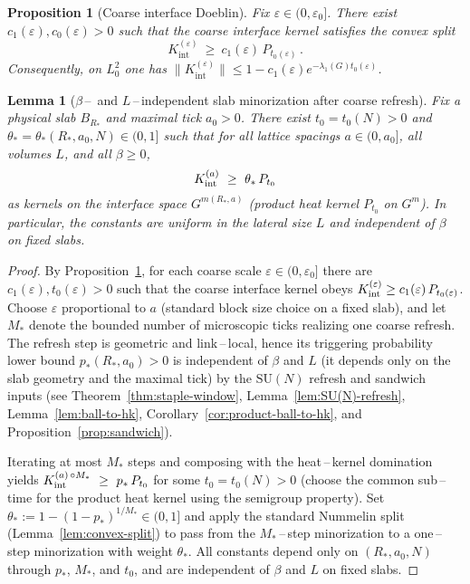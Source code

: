 \documentclass[11pt]{amsart}
\theoremstyle{plain}
\newtheorem{lemma}[theorem]{Lemma}
\newtheorem{proposition}[theorem]{Proposition}
\theoremstyle{definition}
\theoremstyle{remark}
\begin{document}
\begin{proposition}[Coarse interface Doeblin]\label{prop:coarse-doeblin}
Fix $\varepsilon\in(0,\varepsilon_0]$. There exist $c_1(\varepsilon),c_0(\varepsilon)>0$ such that the coarse interface kernel satisfies the convex split
\[
  K_{\mathrm{int}}^{(\varepsilon)}\ \ge\ c_1(\varepsilon)\, P_{t_0(\varepsilon)}\,.
\]
Consequently, on $L_0^2$ one has $\|K_{\mathrm{int}}^{(\varepsilon)}\|\le 1- c_1(\varepsilon) e^{-\lambda_1(G) t_0(\varepsilon)}$.
\end{proposition}

\begin{lemma}[\boldmath $\beta$\,–\, and $L$\,–\,independent slab minorization after coarse refresh]\label{lem:beta-L-independent-minorization}
Fix a physical slab $B_{R_*}$ and maximal tick $a_0>0$. There exist $t_0=t_0(N)>0$ and $\theta_*=\theta_*(R_*,a_0,N)\in(0,1]$ such that for all lattice spacings $a\in(0,a_0]$, all volumes $L$, and all $\beta\ge 0$,
\[
  K_{\rm int}^{(a)}\ \ge\ \theta_*\, P_{t_0}
\]
as kernels on the interface space $G^{m(R_*,a)}$ (product heat kernel $P_{t_0}$ on $G^m$). In particular, the constants are uniform in the lateral size $L$ and independent of $\beta$ on fixed slabs.
\end{lemma}
\begin{proof}
By Proposition~\ref{prop:coarse-doeblin}, for each coarse scale $\varepsilon\in(0,\varepsilon_0]$ there are $c_1(\varepsilon),t_0(\varepsilon)>0$ such that the coarse interface kernel obeys $K^{(\varepsilon)}_{\rm int}\ge c_1(\varepsilon)\,P_{t_0(\varepsilon)}$. Choose $\varepsilon$ proportional to $a$ (standard block size choice on a fixed slab), and let $M_*$ denote the bounded number of microscopic ticks realizing one coarse refresh. The refresh step is geometric and link\,–\,local, hence its triggering probability lower bound $p_*(R_*,a_0)>0$ is independent of $\beta$ and $L$ (it depends only on the slab geometry and the maximal tick) by the $\mathrm{SU}(N)$ refresh and sandwich inputs (see Theorem~\ref{thm:staple-window}, Lemma~\ref{lem:SU(N)-refresh}, Lemma~\ref{lem:ball-to-hk}, Corollary~\ref{cor:product-ball-to-hk}, and Proposition~\ref{prop:sandwich}).

Iterating at most $M_*$ steps and composing with the heat\,–\,kernel domination yields
\(
  K_{\rm int}^{(a)\,\circ M_*}\ \ge\ p_*\, P_{t_0}
\)
for some $t_0=t_0(N)>0$ (choose the common sub\,–\,time for the product heat kernel using the semigroup property). Set $\theta_*:=1 - (1-p_*)^{1/M_*}\in(0,1]$ and apply the standard Nummelin split (Lemma~\ref{lem:convex-split}) to pass from the $M_*$\,–\,step minorization to a one\,–\,step minorization with weight $\theta_*$. All constants depend only on $(R_*,a_0,N)$ through $p_*$, $M_*$, and $t_0$, and are independent of $\beta$ and $L$ on fixed slabs.
\end{proof}
\end{document}

